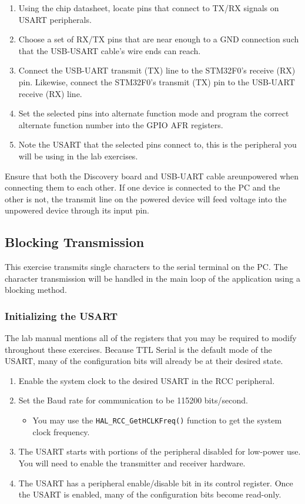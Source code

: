 \documentclass[openany,11pt,fleqn]{book} %
\begin{document}
 \begin{enumerate}
     \item Using the chip datasheet, locate pins that connect to TX/RX signals on USART peripherals.
     \item Choose a set of RX/TX pins that are near enough to a GND connection such that the USB-USART cable's wire ends can reach. 
     \item Connect the USB-UART transmit (TX) line to the STM32F0's receive (RX) pin. Likewise, connect the  STM32F0's transmit (TX) pin to the USB-UART receive (RX) line.
     \item Set the selected pins into alternate function mode and program the correct alternate function number into the GPIO AFR registers. 
     \item Note the USART that the selected pins connect to, this is the peripheral you will be using in the lab exercises.  
 \end{enumerate}

\begin{warning}
    Ensure that both the Discovery board and USB-UART cable areunpowered when connecting them to each other. If one device is connected to the PC and the other is not, the transmit line on the powered device will feed voltage into the unpowered device through its input pin. 
\end{warning}

\subsection{Blocking Transmission}	
This exercise transmits single characters to the serial terminal on the PC. The character transmission will be handled in the main loop of the application using a blocking method. 

\subsubsection{Initializing the USART}
The lab manual mentions all of the registers that you may be required to modify throughout these exercises. Because TTL Serial is the default mode of the USART, many of the configuration bits will already be at their desired state. 

\begin{enumerate}
    \item Enable the system clock to the desired USART in the RCC peripheral.
    \item Set the Baud rate for communication to be 115200 bits/second. 
    \begin{itemize}
        \item You may use the \texttt{HAL\_RCC\_GetHCLKFreq()} function to get the system clock frequency. 
    \end{itemize}
    \item The USART starts with portions of the peripheral disabled for low-power use. You will need to enable the transmitter and receiver hardware.
    \item The USART has a peripheral enable/disable bit in its control register. Once the USART is enabled, many of the configuration bits become read-only.  
\end{enumerate}
\end{document}
